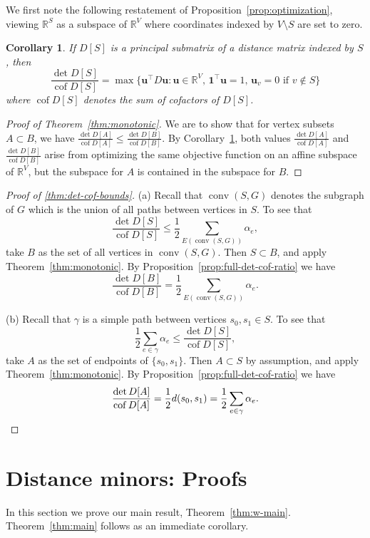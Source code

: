 \documentclass{amsart}
\newtheorem{cor}[thm]{Corollary}
\theoremstyle{definition}
\newcommand{\RR}{\mathbb{R}}
\newcommand{\bone}{\mathbf{1}}
\newcommand{\boldu}{\mathbf{u}}
\newcommand{\tr}{\intercal}
\DeclareMathOperator{\cof}{cof}
\DeclareMathOperator{\conv}{conv}
\newcommand{\display}{\displaystyle}
\begin{document}
We first note the following restatement of Proposition~\ref{prop:optimization}, viewing $\RR^S$ as a subspace of $\RR^V$ 
where coordinates indexed by $V \setminus S$ are set to zero.
\begin{cor}
\label{cor:optimization}
If $D[S]$ is a principal submatrix of a distance matrix indexed by $S$, then 
\[
	\frac{\det D[S]}{\cof D[S]} = \max \{\boldu^\tr D \boldu : \boldu \in \RR^V,\, \bone^\tr \boldu = 1,\, \boldu_v = 0 \text{ if } v \not\in S \}
\]
where $\cof D[S]$ denotes the sum of cofactors of $D[S]$.
\end{cor}

\begin{proof}[Proof of Theorem~\ref{thm:monotonic}]
We are to show that for vertex subsets $A \subset B$, we have
$\displaystyle 
\frac{\det D[A]}{\cof D[A]} \leq \frac{\det D[B]}{\cof D[B]}.
$
By Corollary~\ref{cor:optimization}, both values $\display \frac{\det D[A]}{\cof D[A]}$ and $\display \frac{\det D[B]}{\cof D[B]}$ arise from optimizing the same objective function on an affine subspace of $\RR^V$, 
but the subspace for $A$ is contained in the subspace for $B$.
\end{proof}

\begin{proof}[Proof of \ref{thm:det-cof-bounds}]
(a)
Recall that $\conv(S, G)$ denotes the subgraph of $G$ which is the union of all paths between vertices in $S$.
To see that
\begin{equation*}
 \frac{\det D[S]}{\cof D[S]} \leq \frac12 \sum_{E(\conv(S, G))} \alpha_e ,
\end{equation*}
take $B$ as the set of all vertices in $\conv(S, G)$.
Then $S \subset B$, and apply Theorem~\ref{thm:monotonic}.
By Proposition~\ref{prop:full-det-cof-ratio} we have
\[
 \frac{\det D[B]}{\cof D[B]} = \frac12 \sum_{E(\conv(S, G))} \alpha_e .
\]

(b) 
Recall that $\gamma$ is a simple path between vertices $s_0, s_1 \in S$.
To see that
\begin{equation*}
	\frac12 \sum_{e \in \gamma} \alpha_e \leq \frac{\det D[S]}{\cof D[S]},
\end{equation*}
take $A$ as the set of endpoints of $\{s_0, s_1\}$.
Then $A \subset S$ by assumption, and apply Theorem~\ref{thm:monotonic}.
By Proposition~\ref{prop:full-det-cof-ratio} we have
\[
	\frac{\det D[A]}{\cof D[A]}
	= \frac12 d(s_0, s_1) 
	= \frac12 \sum_{e \in \gamma} \alpha_e .
	\qedhere
\]
\end{proof}


\section{Distance minors: Proofs}
In this section we prove our main result, Theorem~\ref{thm:w-main}.
Theorem~\ref{thm:main} follows as an immediate corollary.
\end{document}
